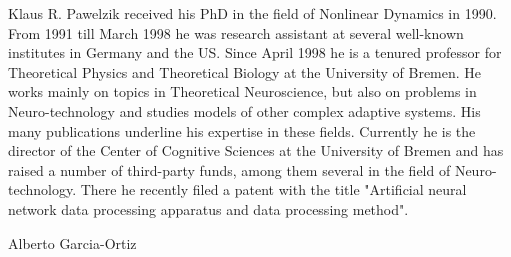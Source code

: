 \begin{IEEEbiography}{Klaus R. Pawelzik}
	received his PhD in the field of Nonlinear Dynamics in
	1990.  From 1991 till March 1998 he was research assistant at several
	well-known institutes in Germany and the US. Since April 1998 he is a
	tenured professor for Theoretical Physics and Theoretical Biology at the
	University of Bremen. He works mainly on topics in Theoretical
	Neuroscience, but also on problems in Neuro-technology and studies
	models of other complex adaptive systems. His many publications
	underline his expertise in these fields. Currently he is the director of
	the Center of Cognitive Sciences at the University of Bremen and has
	raised a number of third-party funds, among them several in the field of
	Neuro-technology. There he recently filed a patent with the title
	"Artificial neural network data processing apparatus and data processing
	method".
\end{IEEEbiography}

\begin{IEEEbiography}{Alberto Garcia-Ortiz}
\end{IEEEbiography}
